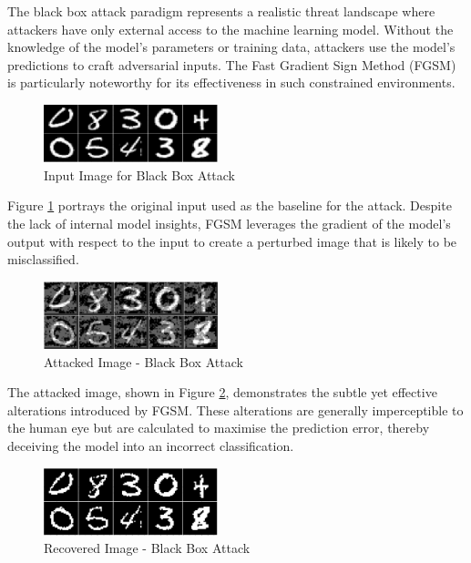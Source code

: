 \documentclass[letterpaper,twocolumn,10pt]{article}
\begin{document}
The black box attack paradigm represents a realistic threat landscape where attackers have only external access to the machine learning model. Without the knowledge of the model's parameters or training data, attackers use the model's predictions to craft adversarial inputs. The Fast Gradient Sign Method (FGSM) is particularly noteworthy for its effectiveness in such constrained environments.

\begin{figure}[htbp]
  \centering
  \includegraphics[width=0.45\textwidth]{j.png}
  \caption{Input Image for Black Box Attack}
  \label{fig:j}
\end{figure}

Figure \ref{fig:j} portrays the original input used as the baseline for the attack. Despite the lack of internal model insights, FGSM leverages the gradient of the model's output with respect to the input to create a perturbed image that is likely to be misclassified.

\begin{figure}[htbp]
  \centering
  \includegraphics[width=0.45\textwidth]{k.png}
  \caption{Attacked Image - Black Box Attack}
  \label{fig:k}
\end{figure}

The attacked image, shown in Figure \ref{fig:k}, demonstrates the subtle yet effective alterations introduced by FGSM. These alterations are generally imperceptible to the human eye but are calculated to maximise the prediction error, thereby deceiving the model into an incorrect classification.


\begin{figure}[htbp]
  \centering
  \includegraphics[width=0.45\textwidth]{l.png}
  \caption{Recovered Image - Black Box Attack}
  \label{fig:l}
\end{figure}
\end{document}
